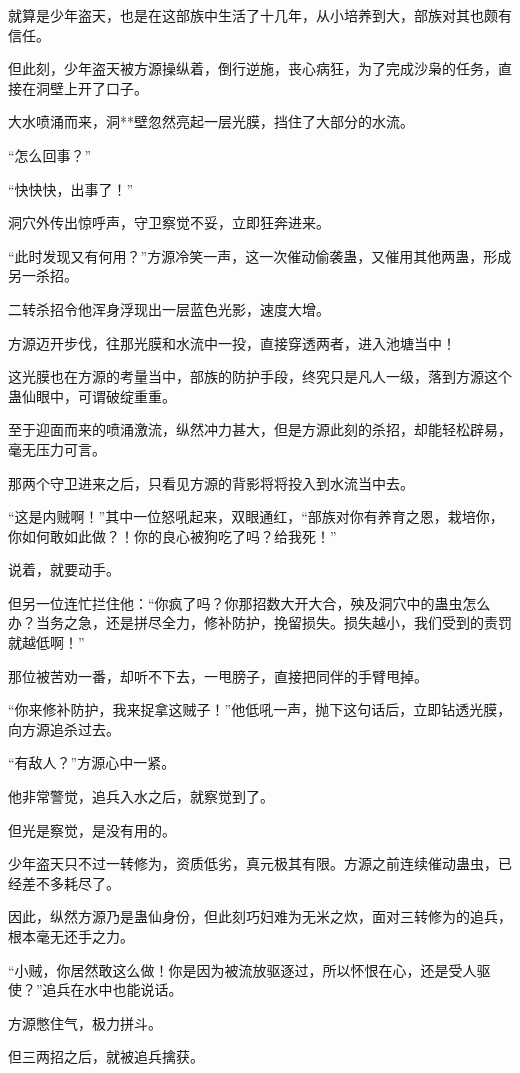 \begin{this_body}
就算是少年盗天，也是在这部族中生活了十几年，从小培养到大，部族对其也颇有信任。

但此刻，少年盗天被方源操纵着，倒行逆施，丧心病狂，为了完成沙枭的任务，直接在洞壁上开了口子。

大水喷涌而来，洞**壁忽然亮起一层光膜，挡住了大部分的水流。

“怎么回事？”

“快快快，出事了！”

洞穴外传出惊呼声，守卫察觉不妥，立即狂奔进来。

“此时发现又有何用？”方源冷笑一声，这一次催动偷袭蛊，又催用其他两蛊，形成另一杀招。

二转杀招令他浑身浮现出一层蓝色光影，速度大增。

方源迈开步伐，往那光膜和水流中一投，直接穿透两者，进入池塘当中！

这光膜也在方源的考量当中，部族的防护手段，终究只是凡人一级，落到方源这个蛊仙眼中，可谓破绽重重。

至于迎面而来的喷涌激流，纵然冲力甚大，但是方源此刻的杀招，却能轻松辟易，毫无压力可言。

那两个守卫进来之后，只看见方源的背影将将投入到水流当中去。

“这是内贼啊！”其中一位怒吼起来，双眼通红，“部族对你有养育之恩，栽培你，你如何敢如此做？！你的良心被狗吃了吗？给我死！”

说着，就要动手。

但另一位连忙拦住他：“你疯了吗？你那招数大开大合，殃及洞穴中的蛊虫怎么办？当务之急，还是拼尽全力，修补防护，挽留损失。损失越小，我们受到的责罚就越低啊！”

那位被苦劝一番，却听不下去，一甩膀子，直接把同伴的手臂甩掉。

“你来修补防护，我来捉拿这贼子！”他低吼一声，抛下这句话后，立即钻透光膜，向方源追杀过去。

“有敌人？”方源心中一紧。

他非常警觉，追兵入水之后，就察觉到了。

但光是察觉，是没有用的。

少年盗天只不过一转修为，资质低劣，真元极其有限。方源之前连续催动蛊虫，已经差不多耗尽了。

因此，纵然方源乃是蛊仙身份，但此刻巧妇难为无米之炊，面对三转修为的追兵，根本毫无还手之力。

“小贼，你居然敢这么做！你是因为被流放驱逐过，所以怀恨在心，还是受人驱使？”追兵在水中也能说话。

方源憋住气，极力拼斗。

但三两招之后，就被追兵擒获。


\end{this_body}
